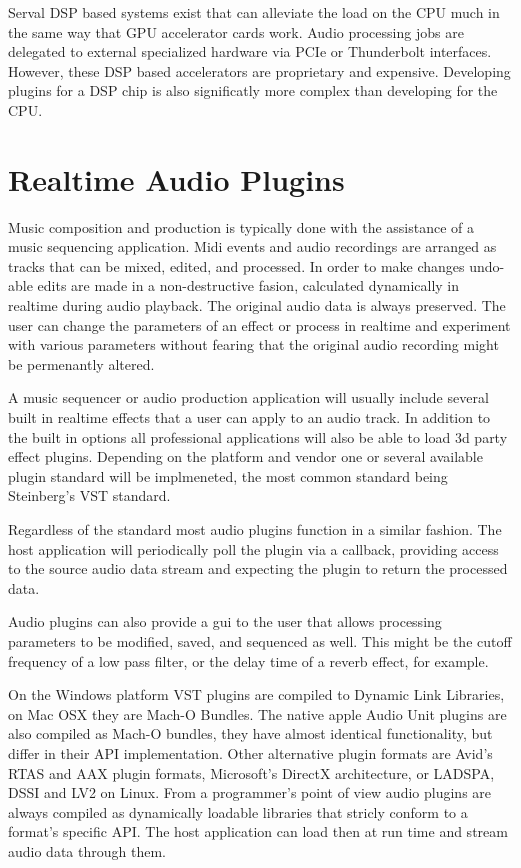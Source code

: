 Serval DSP based systems exist that can alleviate the load on the CPU much in the same way that GPU accelerator cards work. Audio processing jobs are delegated to external specialized hardware via PCIe or Thunderbolt interfaces. However, these DSP based accelerators are proprietary and expensive. Developing plugins for a DSP chip is also significatly more complex than developing for the CPU.

\section{Realtime Audio Plugins}

Music composition and production is typically done with the assistance of a music sequencing application. Midi events and audio recordings are arranged as tracks that can be mixed, edited, and processed. In order to make changes undo-able edits are made in a non-destructive fasion, calculated dynamically in realtime during audio playback. The original audio data is always preserved. The user can change the parameters of an effect or process in realtime and experiment with various parameters without fearing that the original audio recording might be permenantly altered.

A music sequencer or audio production application will usually include several built in realtime effects that a user can apply to an audio track. In addition to the built in options all professional applications will also be able to load 3d party effect plugins. Depending on the platform and vendor one or several available plugin standard will be implmeneted, the most common standard being Steinberg's VST standard.

Regardless of the standard most audio plugins function in a similar fashion. The host application will periodically poll the plugin via a callback, providing access to the source audio data stream and expecting the plugin to return the processed data.

Audio plugins can also provide a gui to the user that allows processing parameters to be modified, saved, and sequenced as well. This might be the cutoff frequency of a low pass filter, or the delay time of a reverb effect, for example.

On the Windows platform VST plugins are compiled to Dynamic Link Libraries, on Mac OSX they are Mach-O Bundles. The native apple Audio Unit plugins are also compiled as Mach-O bundles, they have almost identical functionality, but differ in their API implementation. Other alternative plugin formats are Avid's RTAS and AAX plugin formats, Microsoft's DirectX architecture, or LADSPA, DSSI and LV2 on Linux. From a programmer's point of view audio plugins are always compiled as dynamically loadable libraries that stricly conform to a format's specific API. The host application can load then at run time and stream audio data through them.

